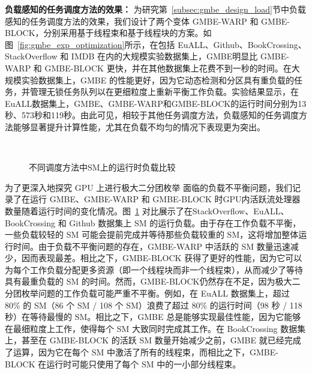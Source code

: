 \textbf{负载感知的任务调度方法的效果：} 为研究第~\ref{subsec:gmbe_design_load}节中负载感知的任务调度方法的效果，我们设计了两个变体 GMBE-WARP 和 GMBE-BLOCK，分别采用基于线程束和基于线程块的方案。如图~\ref{fig:gmbe_exp_optimization}所示，在包括 EuALL、Github、BookCrossing、StackOverflow 和 IMDB 在内的大规模实验数据集上，GMBE明显比 GMBE-WARP 和 GMBE-BLOCK 更快，并在其他数据集上花费不到一秒的时间。在大规模实验数据集上，GMBE 的性能更好，因为它动态检测和分区具有重负载的任务，并管理无锁任务队列以在更细粒度上重新平衡工作负载。实验结果显示，在EuALL数据集上，GMBE、GMBE-WARP和GMBE-BLOCK的运行时间分别为13秒、573秒和119秒。由此可见，相较于其他任务调度方法，负载感知的任务调度方法能够显著提升计算性能，尤其在负载不均匀的情况下表现更为突出。

\begin{figure} [H]
	\centering
	 \\

	\caption{不同调度方法中SM上的运行时负载比较}

	\label{fig:gmbe_exp_balance}
\end{figure}



为了更深入地探究 GPU 上进行极大二分团枚举 面临的负载不平衡问题，我们记录了在运行 GMBE、GMBE-WARP 和 GMBE-BLOCK 时GPU内活跃流处理器数量随着运行时间的变化情况。图~\ref{fig:gmbe_exp_balance} 对比展示了在StackOverflow、EuALL、BookCrossing 和 Github 数据集上 SM 的运行负载。由于存在工作负载不平衡，一些负载较轻的 SM 可能会提前完成并等待那些负载较重的 SM，这将增加整体运行时间。由于负载不平衡问题的存在，GMBE-WARP 中活跃的 SM 数量迅速减少，因而表现最差。相比之下，GMBE-BLOCK 获得了更好的性能，因为它可以为每个工作负载分配更多资源（即一个线程块而非一个线程束），从而减少了等待具有最重负载的 SM 的时间。然而，GMBE-BLOCK仍然存在不足，因为极大二分团枚举问题的工作负载可能严重不平衡。例如，在 EuALL 数据集上，超过 80\% 的 SM（86 个 SM / 108 个 SM）浪费了超过 80\% 的运行时间（98 秒 / 118 秒）在等待最慢的 SM。相比之下，GMBE 总是能够实现最佳性能，因为它能够在最细粒度上工作，使得每个 SM 大致同时完成其工作。在 BookCrossing 数据集上，甚至在 GMBE-BLOCK 的活跃 SM 数量开始减少之前，GMBE 就已经完成了运算，因为它在每个 SM 中激活了所有的线程束，而相比之下，GMBE-BLOCK 在运行时可能只使用了每个 SM 中的一小部分线程束。



